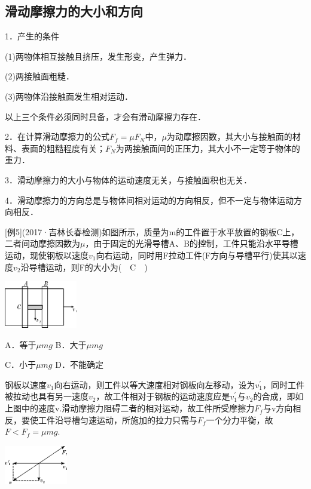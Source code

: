 \documentclass[cn,10.5pt,chinese,mac,chinesefont=founder]{elegantbook}
\begin{document}
\subsection{滑动摩擦力的大小和方向}

1．产生的条件

(1)两物体相互接触且挤压，发生形变，产生弹力．

(2)两接触面粗糙．

(3)两物体沿接触面发生相对运动．

以上三个条件必须同时具备，才会有滑动摩擦力存在．

2．在计算滑动摩擦力的公式$F_f=\mu F_N$中，$\mu$为动摩擦因数，其大小与接触面的材料、表面的粗糙程度有关；$F_N$为两接触面间的正压力，其大小不一定等于物体的重力．

3．滑动摩擦力的大小与物体的运动速度无关，与接触面积也无关．

4．滑动摩擦力的方向总是与物体间相对运动的方向相反，但不一定与物体运动方向相反．

{[}例5{]}(2017·吉林长春检测)如图所示，质量为m的工件置于水平放置的钢板C上，二者间动摩擦因数为$\mu$，由于固定的光滑导槽A、B的控制，工件只能沿水平导槽运动，现使钢板以速度$v_1$向右运动，同时用F拉动工件(F方向与导槽平行)使其以速度$v_2$沿导槽运动，则F的大小为(　C　)

\begin{center}\includegraphics[width=1.25in,height=0.8125in]{media/image50.png}\end{center}

A．等于$\mu mg$ B．大于$\mu mg$

C．小于$\mu mg$ D．不能确定
\begin{solution}
	钢板以速度$v_1$向右运动，则工件以等大速度相对钢板向左移动，设为$v_1^{'}$，同时工件被拉动也具有另一速度$v_2$，故工件相对于钢板的运动速度应是$v_1^{'}$与$v_2$的合成，即如上图中的速度v.滑动摩擦力阻碍二者的相对运动，故工件所受摩擦力$F_f$与v方向相反，要使工件沿导槽匀速运动，所施加的拉力只需与$F_f$一个分力平衡，故 $F< F_f=\mu mg$.
\end{solution}

\begin{center}\includegraphics[width=1.08333in,height=0.66667in]{media/image51.png}\end{center}
\newpage
\end{document}
